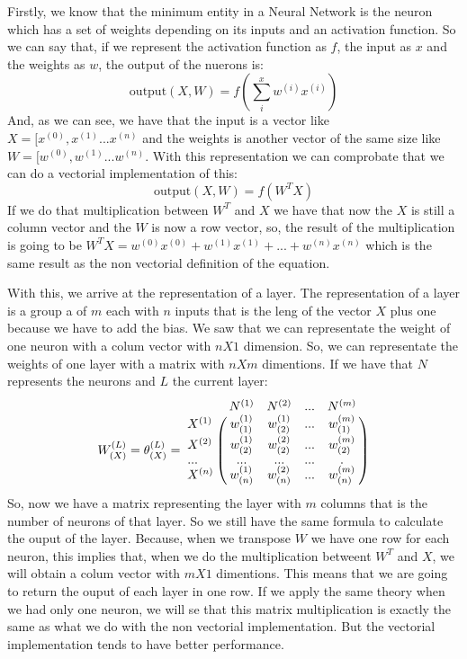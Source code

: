 \documentclass[12pt]{article}
\begin{document}
Firstly, we know that the minimum entity in a Neural Network is the neuron which has a set of weights depending on its inputs and an activation function. So we can say that, if we represent the activation function as $f$, the input as $x$ and the weights as $w$, the output of the nuerons is:
\begin{equation}
\textrm{output}(X,W)=f(\displaystyle\sum_{i}^{x}w^{(i)}x^{(i)})
\end{equation}
And, as we can see, we have that the input is a vector like $X=[x^{(0)},x^{(1)}...x^{(n)}$ and the weights is another vector of the same size like $W=[w^{(0)},w^{(1)}...w^{(n)}$. With this representation we can comprobate that we can do a vectorial implementation of this:
\begin{equation}
\textrm{output}(X,W)=f(W^{T}X)
\end{equation}
If we do that multiplication between $W^{T}$ and $X$ we have that now the $X$ is still a column vector and the $W$ is now a row vector, so, the result of the multiplication is going to be $W^{T}X = w^{(0)}x^{(0)}+w^{(1)}x^{(1)}+...+w^{(n)}x^{(n)}$ which is the same result as the non vectorial definition of the equation.

With this, we arrive at the representation of a layer. The representation of a layer is a group a of $m$ each with $n$ inputs that is the leng of the vector $X$ plus one because we have to add the bias. We saw that we can representate the weight of one neuron with a colum vector with $nX1$ dimension. So, we can representate the weights of one layer with a matrix with $nXm$ dimentions. If we have that $N$ represents the neurons and $L$ the current layer:
\begin{equation}
W_{(X)}^{(L)}= \theta_{(X)}^{(L)} = \bordermatrix{~ & N^{(1)} & N^{(2)} & \textrm{...} & N^{(m)} \cr X^{(1)} & w_{(1)}^{(1)} & w_{(2)}^{(1)}&\textrm{...}&w_{(1)}^{(m)} \cr X^{(2)} & w_{(2)}^{(1)} & w_{(2)}^{(2)}&\textrm{...}&w_{(2)}^{(m)} \cr \textrm{...} & \textrm{...} & \textrm{...} &\textrm{...}&. \cr X^{(n)}&w_{(n)}^{(1)}&w_{(n)}^{(2)}&\textrm{...}&w_{(n)}^{(m)}\cr}
\end{equation}
 So, now we have a matrix representing the layer with $m$ columns that is the number of neurons of that layer. So we still have the same formula to calculate the ouput of the layer. Because, when we transpose $W$ we have one row for each neuron, this implies that, when we do the multiplication betweent $W^T$ and $X$, we will obtain a colum vector with $mX1$ dimentions. This means that we are going to return the ouput of each layer in one row. If we apply the same theory when we had only one neuron, we will se that this matrix multiplication is exactly the same as what we do with the non vectorial implementation. But the vectorial implementation tends to have better performance.
 
\end{document}
